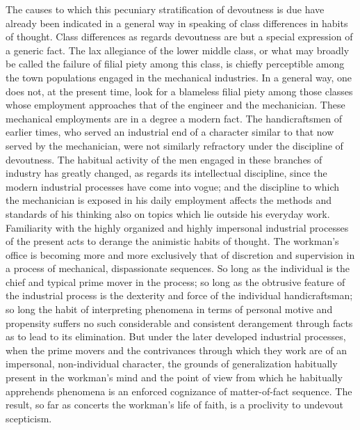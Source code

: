 \documentclass[12pt]{report}
\begin{document}
The causes to which this pecuniary stratification of devoutness is
due have already been indicated in a general way in speaking of
class differences in habits of thought. Class differences as regards
devoutness are but a special expression of a generic fact. The lax
allegiance of the lower middle class, or what may broadly be called the
failure of filial piety among this class, is chiefly perceptible among
the town populations engaged in the mechanical industries. In a general
way, one does not, at the present time, look for a blameless filial
piety among those classes whose employment approaches that of the
engineer and the mechanician. These mechanical employments are in a
degree a modern fact. The handicraftsmen of earlier times, who served
an industrial end of a character similar to that now served by the
mechanician, were not similarly refractory under the discipline of
devoutness. The habitual activity of the men engaged in these branches
of industry has greatly changed, as regards its intellectual discipline,
since the modern industrial processes have come into vogue; and the
discipline to which the mechanician is exposed in his daily employment
affects the methods and standards of his thinking also on topics which
lie outside his everyday work. Familiarity with the highly organized and
highly impersonal industrial processes of the present acts to derange
the animistic habits of thought. The workman's office is becoming more
and more exclusively that of discretion and supervision in a process of
mechanical, dispassionate sequences. So long as the individual is the
chief and typical prime mover in the process; so long as the obtrusive
feature of the industrial process is the dexterity and force of the
individual handicraftsman; so long the habit of interpreting phenomena
in terms of personal motive and propensity suffers no such considerable
and consistent derangement through facts as to lead to its elimination.
But under the later developed industrial processes, when the prime
movers and the contrivances through which they work are of an
impersonal, non-individual character, the grounds of generalization
habitually present in the workman's mind and the point of view from
which he habitually apprehends phenomena is an enforced cognizance of
matter-of-fact sequence. The result, so far as concerts the workman's
life of faith, is a proclivity to undevout scepticism.
\end{document}

